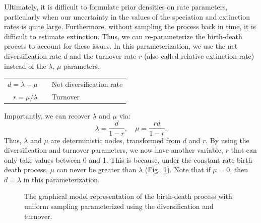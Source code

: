 Ultimately, it is difficult to formulate prior densities on rate parameters, particularly when our uncertainty in the values of the speciation and extinction rates is quite large. 
Furthermore, without sampling the process back in time, it is difficult to estimate extinction. 
Thus, we can re-parameterize the birth-death process to account for these issues.
In this parameterization, we use the net diversification rate $d$ and the turnover rate $r$ (also called relative extinction rate) instead of the $\lambda$, $\mu$ parameters.
\begin{center}
\begin{tabular}{rcl}
$d=\lambda-\mu$ & \hspace{6mm} & Net diversification rate\\
$r=\mu / \lambda$ & & Turnover\\
\end{tabular} 
\end{center}
Importantly, we can recover $\lambda$ and $\mu$ via: 
\begin{equation}\label{lambdamufxns}
\lambda=\frac{d}{1-r}, \quad \mu=\frac{rd}{1-r}.
\end{equation}
Thus, $\lambda$ and $\mu$ are deterministic nodes, transformed from $d$ and $r$. 
By using the diversification and turnover parameters, we now have another variable, $r$ that can only take values between 0 and 1.
This is because, under the constant-rate birth-death process, $\mu$ can never be greater than $\lambda$ (Fig.~\ref{bdrGMFig2}). 
Note that if $\mu=0$, then $d = \lambda$ in this parameterization.


\begin{figure}[h!]
\centering
{}
\caption{\small The graphical model representation of the birth-death process with uniform sampling parameterized using the diversification and turnover.}
\label{bdrGMFig2}
\end{figure}

